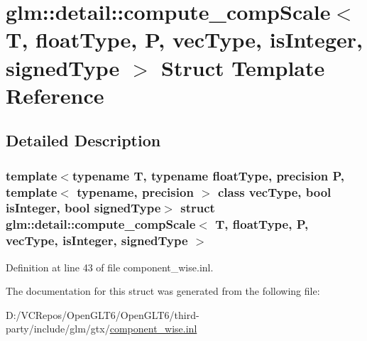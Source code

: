 \hypertarget{structglm_1_1detail_1_1compute__comp_scale}{}\section{glm\+::detail\+::compute\+\_\+comp\+Scale$<$ T, float\+Type, P, vec\+Type, is\+Integer, signed\+Type $>$ Struct Template Reference}
\label{structglm_1_1detail_1_1compute__comp_scale}


\subsection{Detailed Description}
\subsubsection*{template$<$typename T, typename float\+Type, precision P, template$<$ typename, precision $>$ class vec\+Type, bool is\+Integer, bool signed\+Type$>$\newline
struct glm\+::detail\+::compute\+\_\+comp\+Scale$<$ T, float\+Type, P, vec\+Type, is\+Integer, signed\+Type $>$}



Definition at line 43 of file component\+\_\+wise.\+inl.



The documentation for this struct was generated from the following file\+:\begin{DoxyCompactItemize}
\item 
D\+:/\+V\+C\+Repos/\+Open\+G\+L\+T6/\+Open\+G\+L\+T6/third-\/party/include/glm/gtx/\mbox{\hyperlink{component__wise_8inl}{component\+\_\+wise.\+inl}}\end{DoxyCompactItemize}
